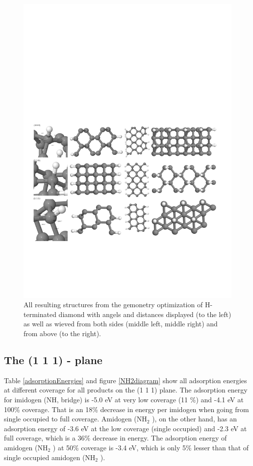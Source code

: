 \documentclass[12pt,a4paper]{article}
\begin{document}
\begin{figure} \captionsetup{width=.8\linewidth} \caption{All resulting structures from the gemonetry optimization of H-terminated diamond with angels and distances displayed (to the left) as well as wieved from both sides (middle left, middle right) and from above (to the right).} \label{H_terminated}
%
\includegraphics[width=.8\linewidth]{pictures/H_terminated2.png}
\end{figure}

\subsection{The (1 1 1) - plane}
Table \ref{adsorptionEnergies} and figure \ref{NH2diagram} show all adsorption energies at different coverage for all products on the (1 1 1) plane. The adsorption energy for imidogen (NH, bridge) is -5.0 eV at very low coverage (11 \%) and -4.1 eV at 100\% coverage. That is an 18\% decrease in energy per imidogen when going from single occupied to full coverage. Amidogen (NH$_2$ ), on the other hand, has an adsorption energy of -3.6 eV at the low coverage (single occupied) and -2.3 eV at full coverage, which is  a 36\% decrease in energy. The adsorption energy of amidogen (NH$_2$ ) at 50\% coverage is -3.4 eV, which is only 5\% lesser than that of single occupied amidogen (NH$_2$ ).
\end{document}
